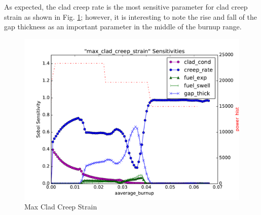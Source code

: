 \documentclass{anstrans} \usepackage{amsmath} \usepackage{amssymb}
\begin{document}
As expected, the clad creep rate is the most sensitive parameter for clad creep strain as shown in Fig.
\ref{fig:strain}; however, it is
interesting to note the rise and fall of the gap thickness as an important parameter in the middle of the
burnup range.
\begin{figure}[htb]
  \centering
  \includegraphics[width=\linewidth]{./sens_max_clad_creep_strain}
  \caption{Max Clad Creep Strain}
  \label{fig:strain}
\end{figure}
\end{document}
